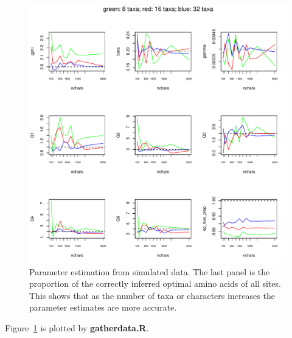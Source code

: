 \documentclass[12pt]{article}
\begin{document}
\begin{figure}[h]
\centering
\includegraphics[width=\textwidth]{para_est_simfromsim.pdf}
\caption{Parameter estimation from simulated data. The last panel is the proportion of the correctly inferred optimal amino acids of all sites. This shows that as the number of taxa or characters increases the parameter estimates are more accurate. }
\label{fig:paraEst}
\end{figure}

Figure~\ref{fig:paraEst} is plotted by {\bf gatherdata.R}.
\end{document}
